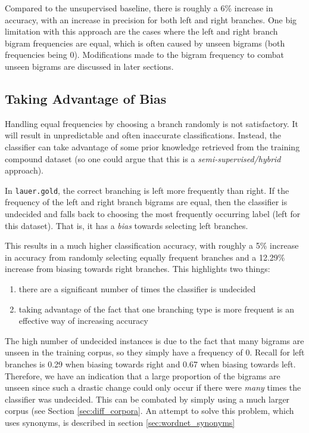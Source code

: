 \documentclass{article}
\begin{document}
Compared to the unsupervised baseline, there is roughly a 6\% increase in accuracy, with an increase in precision for both left and right branches. One big limitation with this approach are the cases where the left and right branch bigram frequencies are equal, which is often caused by unseen bigrams (both frequencies being 0). Modifications made to the bigram frequency to combat unseen bigrams are discussed in later sections.

\subsection{Taking Advantage of Bias}

Handling equal frequencies by choosing a branch randomly is not satisfactory. It will result in unpredictable and often inaccurate classifications. Instead, the classifier can take advantage of some prior knowledge retrieved from the training compound dataset (so one could argue that this is a \textit{semi-supervised/hybrid} approach).

In \texttt{lauer.gold}, the correct branching is left more frequently than right. If the frequency of the left and right branch bigrams are equal, then the classifier is undecided and falls back to choosing the most frequently occurring label (left for this dataset). That is, it has a \textit{bias} towards selecting left branches.

This results in a much higher classification accuracy, with roughly a 5\% increase in accuracy from randomly selecting equally frequent branches and a 12.29\% increase from biasing towards right branches. This highlights two things:
\begin{enumerate}
	\item there are a significant number of times the classifier is undecided
	\item taking advantage of the fact that one branching type is more frequent is an effective way of increasing accuracy
\end{enumerate}

The high number of undecided instances is due to the fact that many bigrams are unseen in the training corpus, so they simply have a frequency of 0. Recall for left branches is 0.29 when biasing towards right and 0.67 when biasing towards left. Therefore, we have an indication that a large proportion of the bigrams are unseen since such a drastic change could only occur if there were \textit{many} times the classifier was undecided.  This can be combated by simply using a much larger corpus (see Section \ref{sec:diff_corpora}. An attempt to solve this problem, which uses synonyms, is described in section \ref{sec:wordnet_synonyms}
\end{document}

